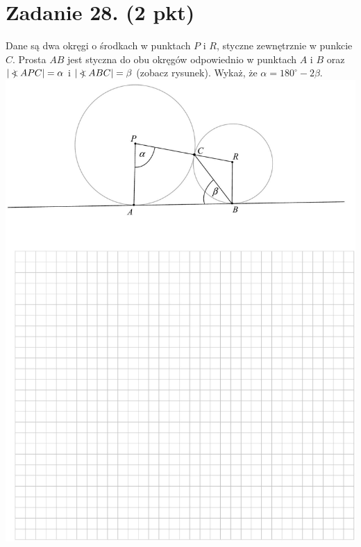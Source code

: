 \documentclass[10pt]{article}
\newcommand\Varangle{\mathop{{<\!\!\!\!\!\text{\small)}}\:}\nolimits}
\begin{document}
\section*{Zadanie 28. (2 pkt)}
Dane są dwa okręgi o środkach w punktach \(P\) i \(R\), styczne zewnętrznie w punkcie \(C\). Prosta \(A B\) jest styczna do obu okręgów odpowiednio w punktach \(A\) i \(B\) oraz \(|\Varangle A P C|=\alpha\) i \(|\Varangle A B C|=\beta\) (zobacz rysunek). Wykaż, że \(\alpha=180^{\circ}-2 \beta\).\\
\includegraphics[max width=\textwidth, center]{2024_11_21_ad8c43efe74fa059d24eg-18}
\end{document}

